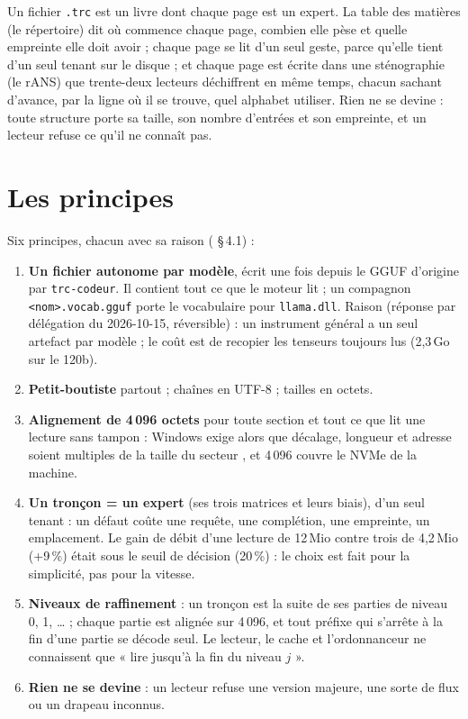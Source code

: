 \begin{enbref}
Un fichier \texttt{.trc} est un livre dont chaque page est un expert. La table des matières (le répertoire) dit où commence chaque page, combien elle pèse et quelle empreinte elle doit avoir ; chaque page se lit d'un seul geste, parce qu'elle tient d'un seul tenant sur le disque ; et chaque page est écrite dans une sténographie (le rANS) que trente-deux lecteurs déchiffrent en même temps, chacun sachant d'avance, par la ligne où il se trouve, quel alphabet utiliser. Rien ne se devine : toute structure porte sa taille, son nombre d'entrées et son empreinte, et un lecteur refuse ce qu'il ne connaît pas.
\end{enbref}

\section{Les principes}\label{t2fmt:sec:principes}

Six principes, chacun avec sa raison ( §\,4.1) :
\begin{enumerate}
\item \textbf{Un fichier autonome par modèle}, écrit une fois depuis le GGUF d'origine par \texttt{trc-codeur}. Il contient tout ce que le moteur lit ; un compagnon \texttt{<nom>.vocab.gguf} porte le vocabulaire pour \texttt{llama.dll}. Raison (réponse par délégation du 2026-10-15, réversible) : un instrument général a un seul artefact par modèle ; le coût est de recopier les tenseurs toujours lus (2,3\,Go sur le 120b).
\item \textbf{Petit-boutiste} partout ; chaînes en UTF-8 ; tailles en octets.
\item \textbf{Alignement de 4\,096 octets} pour toute section et tout ce que lit une lecture sans tampon : Windows exige alors que décalage, longueur et adresse soient multiples de la taille du secteur \cite{microsoft2025filebuffering}, et 4\,096 couvre le NVMe de la machine.
\item \textbf{Un tronçon = un expert} (ses trois matrices et leurs biais), d'un seul tenant : un défaut coûte une requête, une complétion, une empreinte, un emplacement. Le gain de débit d'une lecture de 12\,Mio contre trois de 4,2\,Mio (+9\,\%) était sous le seuil de décision (20\,\%) : le choix est fait pour la simplicité, pas pour la vitesse.
\item \textbf{Niveaux de raffinement} : un tronçon est la suite de ses parties de niveau 0, 1, … ; chaque partie est alignée sur 4\,096, et tout préfixe qui s'arrête à la fin d'une partie se décode seul. Le lecteur, le cache et l'ordonnanceur ne connaissent que « lire jusqu'à la fin du niveau $j$ ».
\item \textbf{Rien ne se devine} : un lecteur refuse une version majeure, une sorte de flux ou un drapeau inconnus.
\end{enumerate}

